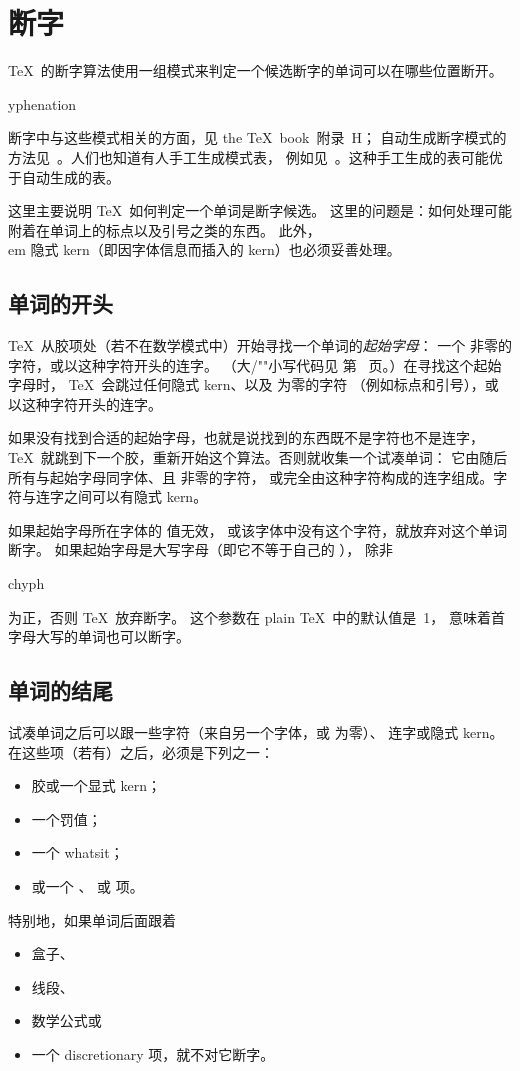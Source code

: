 \documentclass[a4paper]{rapport3}
\makeatletter
\def\TeXbook{the \TeX\ book}\def\web{{\sc web}}
\def\term#1\par{\index{#1}}
\def\cstoidx#1\par{\index{#1@\cs{#1}}}
\def\csidx#1{\cstoidx #1\par\cs{#1}}
\makeatother
\begin{document}
\section{断字}

\TeX\ 的断字算法使用一组模式来判定一个候选断字的单词可以在哪些位置断开。
\term hyphenation\par
断字中与这些模式相关的方面，见 \TeXbook\ 附录~H；
自动生成断字模式的方法见~\cite{Liang}。人们也知道有人手工生成模式表，
例如见~\cite{Vas:add}。这种手工生成的表可能优于自动生成的表。

这里主要说明 \TeX\ 如何判定一个单词是断字候选。
这里的问题是：如何处理可能附着在单词上的标点以及引号之类的东西。
此外，{\\em 隐式 kern\/}（即因字体信息而插入的 kern）也必须妥善处理。

\subsection{单词的开头}

\TeX\ 从胶项处（若不在数学模式中）开始寻找一个单词的{\em 起始字母\/}：
一个  非零的字符，或以这种字符开头的连字。
\mdqon
（大/""小写代码见
\mdqoff
第~\pageref{uc/lc} 页。）在寻找这个起始字母时，
\TeX\ 会跳过任何隐式 kern、以及  为零的字符
（例如标点和引号），或以这种字符开头的连字。

如果没有找到合适的起始字母，也就是说找到的东西既不是字符也不是连字，
\TeX\ 就跳到下一个胶，重新开始这个算法。否则就收集一个试凑单词：
它由随后所有与起始字母同字体、且  非零的字符，
或完全由这种字符构成的连字组成。字符与连字之间可以有隐式 kern。

如果起始字母所在字体的  值无效，
或该字体中没有这个字符，就放弃对这个单词断字。
如果起始字母是大写字母（即它不等于自己的 ），
除非 \csidx{uchyph} 为正，否则 \TeX\ 放弃断字。
这个参数在 plain \TeX\ 中的默认值是~1，
意味着首字母大写的单词也可以断字。

\subsection{单词的结尾}


试凑单词之后可以跟一些字符（来自另一个字体，或  为零）、
连字或隐式 kern。在这些项（若有）之后，必须是下列之一：
\begin{itemize}\item 胶或一个显式 kern；
\item 一个罚值；
\item 一个 whatsit；
\item 或一个 、 或  项。
\end{itemize}
特别地，如果单词后面跟着 \begin{itemize}\item 盒子、\item 线段、
\item 数学公式或 \item 一个 discretionary 项，就不对它断字。\end{itemize}
\end{document}
